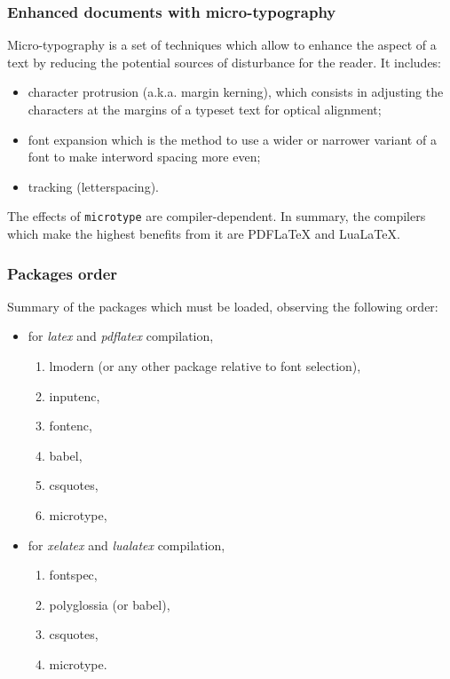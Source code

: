 \documentclass[11pt]{beamer}
\begin{document}
\begin{frame}
	\frametitle{Enhanced documents with micro-typography}
	
	Micro-typography is a set of techniques which allow to enhance the aspect of a text by reducing the potential sources of disturbance for the reader.
	It includes:
	\begin{itemize}
		\item character protrusion (a.k.a. margin kerning), which consists in adjusting the characters at the margins of a typeset text for optical alignment;
		\item font expansion which is the method to use a wider or narrower variant of a font to make interword spacing more even;
		\item tracking (letterspacing).
	\end{itemize}

	The effects of \texttt{microtype} are compiler-dependent.
	In summary, the compilers which make the highest benefits from it are PDFLaTeX and LuaLaTeX.
\end{frame}


\begin{frame}
	\frametitle{Packages order}
	
	Summary of the packages which must be loaded, observing the following order:
	\begin{itemize}
		\item for \textit{latex} and \textit{pdflatex} compilation,
		\begin{enumerate}
			\item lmodern (or any other package relative to font selection),
			\item inputenc,
			\item fontenc,
			\item babel,
			\item csquotes,
			\item microtype,
		\end{enumerate}
		\item for \textit{xelatex} and \textit{lualatex} compilation,
		\begin{enumerate}
			\item fontspec,
			\item polyglossia (or babel),
			\item csquotes,
			\item microtype.
		\end{enumerate}
	\end{itemize}
\end{frame}


  

\end{document}
